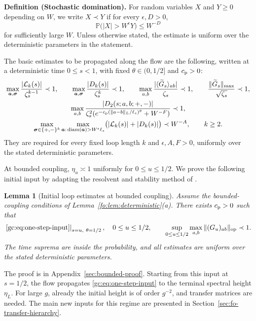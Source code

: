 \documentclass[11pt]{article}
\numberwithin{equation}{section}
\newtheorem{lemma}[theorem]{Lemma}
\theoremstyle{remark}
\newcommand{\Prob}{\mathbb P}
\newcommand{\wt}{\widetilde}
\newcommand{\diam}{\operatorname{diam}}
\newcommand{\cL}{\mathcal L}
\newcommand{\op}{\mathrm{op}}
\begin{document}
\noindent\textbf{Definition (Stochastic domination).}
For random variables $X$ and $Y\ge0$ depending on $W$, we write
$X\prec Y$ if for every $\epsilon,D>0$,
\[
 \Prob\bigl(|X|>W^\epsilon Y\bigr)\le W^{-D}
\]
for sufficiently large $W$.
Unless otherwise stated, the estimate is uniform over the deterministic
parameters in the statement.

The basic estimates to be propagated along the flow are the following,
written at a deterministic time $0\le s<1$, with fixed
$\theta\in(0,1/2]$ and $c_{\rm p}>0$:
\begin{equation}\label{gc:eq:one-step-input}
 \begin{gathered}
 \max_{\boldsymbol a,\boldsymbol\sigma}\frac{|\cL_k(s)|}{\zeta_s^{k-1}}\prec1,
 \qquad \max_{\boldsymbol a,\boldsymbol\sigma}\frac{|D_k(s)|}{\zeta_s^k}\prec1,\qquad
 \max_{a,b}\frac{|\langle\wt G_s\rangle_{ab}|}{\zeta_s}\prec1,\qquad
 \frac{\|\wt G_s\|_{\max}}{\sqrt{\zeta_s}}\prec1,\\
 \max_{a,b}\frac{|D_2(s;a,b;+,-)|}
 {\zeta_s^2(e^{-c_{\rm p}(\|a-b\|_L/\ell_s)^\theta}+W^{-F})}\prec1,\\
 \max_{\boldsymbol\sigma\in\{+,-\}^k}
 \max_{\boldsymbol a:\,\diam(\boldsymbol a)>W^\epsilon\ell_s}
       \bigl(|\cL_k(s)|+|D_k(s)|\bigr)\prec W^{-A},\qquad k\ge2.
 \end{gathered}
\end{equation}
They are required for every fixed loop length $k$ and
$\epsilon,A,F>0$, uniformly over the stated deterministic parameters.

At bounded coupling, $\eta_u\asymp1$ uniformly for $0\le u\le1/2$.
We prove the following initial input by adapting the resolvent and stability
method of \cite[Section~8 and Appendix~B.1]{DYYY}.

\begin{lemma}[Initial loop estimates at bounded coupling]
\label{fo:lem:bounded-initial}
Assume the bounded-coupling conditions of
Lemma~\ref{fo:lem:deterministic}(a). There exists $c_{\rm p}>0$ such that
\begin{equation}\label{gc:eq:iteration-input}
 \left.\eqref{gc:eq:one-step-input}\right|_{s=u,\ \theta=1/2},
 \quad 0\le u\le1/2,
 \qquad \sup_{0\le u\le1/2}\max_{a,b}\|(G_u)_{ab}\|_{\op}\prec1.
\end{equation}
The time suprema are inside the probability, and all estimates are
uniform over the stated deterministic parameters.
\end{lemma}
The proof is in Appendix~\ref{sec:bounded-proof}.
Starting from this input at $s=1/2$, the flow propagates
\eqref{gc:eq:one-step-input} to the terminal spectral height $\eta_L$.
For large $g$, already the initial height is of order $g^{-2}$,
and transfer matrices are needed. The main new inputs for this regime
are presented in Section~\ref{sec:fo-transfer-hierarchy}.
\end{document}
